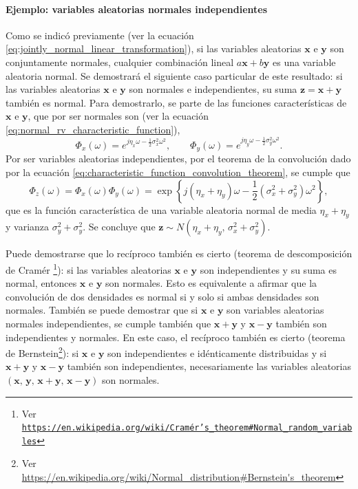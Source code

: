 \documentclass[a4paper]{report}
\newcommand{\x}{\mathbf{x}}
\newcommand{\y}{\mathbf{y}}
\newcommand{\z}{\mathbf{z}}
\begin{document}
\paragraph{Ejemplo: variables aleatorias normales independientes}

Como se indicó previamente (ver la ecuación \ref{eq:jointly_normal_linear_transformation}), si las variables aleatorias \(\x\) e \(\y\) son conjuntamente normales, cualquier combinación lineal \(a\x+b\y\) es una variable aleatoria normal. Se demostrará el siguiente caso particular de este resultado: si las variables aleatorias \(\x\) e \(\y\) son normales e independientes, su suma \(\z=\x+\y\) también es normal. Para demostrarlo, se parte de las funciones características de \(\x\) e \(\y\), que por ser normales son (ver la ecuación \ref{eq:normal_rv_characteristic_function}),
\[
 \Phi_x(\omega)=e^{j\eta_x\omega-\frac{1}{2}\sigma_x^2\omega^2},\qquad \Phi_y(\omega)=e^{j\eta_y\omega-\frac{1}{2}\sigma_y^2\omega^2}.
\]
Por ser variables aleatorias independientes, por el teorema de la convolución dado por la ecuación \ref{eq:characteristic_function_convolution_theorem}, se cumple que
\[
 \Phi_z(\omega)=\Phi_x(\omega)\Phi_y(\omega)=\exp\left\{j(\eta_x+\eta_y)\omega-\frac{1}{2}(\sigma_x^2+\sigma_y^2)\omega^2\right\},
\]
que es la función característica de una variable aleatoria normal de media \(\eta_x+\eta_y\) y varianza \(\sigma_y^2+\sigma_y^2\). Se concluye que \(\z\sim N(\eta_x+\eta_y,\,\sigma_x^2+\sigma_y^2)\).

Puede demostrarse que lo recíproco también es cierto (teorema de descomposición de Cramér
\footnote{Ver \href{https://en.wikipedia.org/wiki/Cram\%C3\%A9r\%27s_theorem\#Normal_random_variables}{\texttt{https://en.wikipedia.org/wiki/Cramér's\_theorem\#Normal\_random\_variables}}}): si las variables aleatorias \(\x\) e \(\y\) son independientes y su suma es normal, entonces \(\x\) e \(\y\) son normales. Esto es equivalente a afirmar que la convolución de dos densidades es normal si y solo si ambas densidades son normales. También se puede demostrar que si \(\x\) e \(\y\) son variables aleatorias normales independientes, se cumple también que \(\x+\y\) y \(\x-\y\) también son independientes y normales. En este caso, el recíproco también es cierto (teorema de Bernstein\footnote{Ver \url{https://en.wikipedia.org/wiki/Normal_distribution\#Bernstein's_theorem}}): si \(\x\) e \(\y\) son independientes e idénticamente distribuidas y si \(\x+\y\) y \(\x-\y\) también son independientes, necesariamente las variables aleatorias \((\x,\,\y,\,\x+\y,\,\x-\y)\) son normales.
\end{document}

